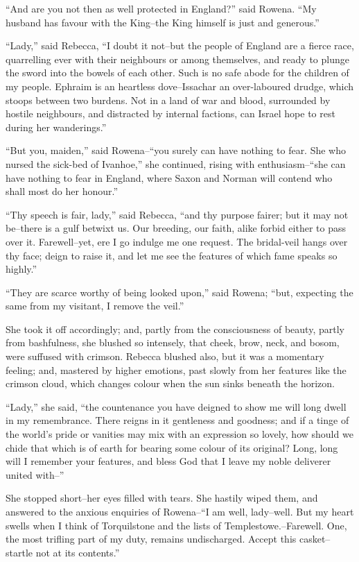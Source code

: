 ``And are you not then as well protected in England?'' said Rowena. ``My
husband has favour with the King--the King himself is just and
generous.''

``Lady,'' said Rebecca, ``I doubt it not--but the people of England are
a fierce race, quarrelling ever with their neighbours or among
themselves, and ready to plunge the sword into the bowels of each other.
Such is no safe abode for the children of my people. Ephraim is an
heartless dove--Issachar an over-laboured drudge, which stoops between
two burdens. Not in a land of war and blood, surrounded by hostile
neighbours, and distracted by internal factions, can Israel hope to rest
during her wanderings.''

``But you, maiden,'' said Rowena--``you surely can have nothing to fear.
She who nursed the sick-bed of Ivanhoe,'' she continued, rising with
enthusiasm--``she can have nothing to fear in England, where Saxon and
Norman will contend who shall most do her honour.''

``Thy speech is fair, lady,'' said Rebecca, ``and thy purpose fairer;
but it may not be--there is a gulf betwixt us. Our breeding, our faith,
alike forbid either to pass over it. Farewell--yet, ere I go indulge me
one request. The bridal-veil hangs over thy face; deign to raise it, and
let me see the features of which fame speaks so highly.''

``They are scarce worthy of being looked upon,'' said Rowena; ``but,
expecting the same from my visitant, I remove the veil.''

She took it off accordingly; and, partly from the consciousness of
beauty, partly from bashfulness, she blushed so intensely, that cheek,
brow, neck, and bosom, were suffused with crimson. Rebecca blushed also,
but it was a momentary feeling; and, mastered by higher emotions, past
slowly from her features like the crimson cloud, which changes colour
when the sun sinks beneath the horizon.

``Lady,'' she said, ``the countenance you have deigned to show me will
long dwell in my remembrance. There reigns in it gentleness and
goodness; and if a tinge of the world's pride or vanities may mix with
an expression so lovely, how should we chide that which is of earth for
bearing some colour of its original? Long, long will I remember your
features, and bless God that I leave my noble deliverer united with--''

She stopped short--her eyes filled with tears. She hastily wiped them,
and answered to the anxious enquiries of Rowena--``I am well,
lady--well. But my heart swells when I think of Torquilstone and the
lists of Templestowe.--Farewell. One, the most trifling part of my duty,
remains undischarged. Accept this casket--startle not at its contents.''

